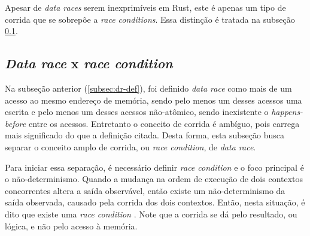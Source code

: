 Apesar de \textit{data races} serem inexprimíveis em Rust, este é apenas um tipo de corrida que se sobrepõe a \textit{race conditions}. Essa distinção é tratada na subseção \ref{subsec:data-race-x-race-condition}.

\subsection{\textit{Data race} x \textit{race condition}}
\label{subsec:data-race-x-race-condition}

Na subseção anterior (\ref{subsec:dr-def}), foi definido \textit{data race} como mais de um acesso ao mesmo endereço de memória, sendo pelo menos um desses acessos uma escrita e pelo menos um desses acessos não-atômico, sendo inexistente o \textit{happens-before} entre os acessos. Entretanto o conceito de corrida é ambíguo, pois carrega mais significado do que a definição citada. Desta forma, esta subseção busca separar o conceito amplo de corrida, ou \textit{race condition}, de \textit{data race}.

Para iniciar essa separação, é necessário definir \textit{race condition} e o foco principal é o não-determinismo. Quando a mudança na ordem de execução de dois contextos concorrentes altera a saída observável, então existe um não-determinismo da saída observada, causado pela corrida dos dois contextos. Então, nesta situação, é dito que existe uma \textit{race condition} \citep{article:netzer-miller-races}. Note que a corrida se dá pelo resultado, ou lógica, e não pelo acesso à memória.

